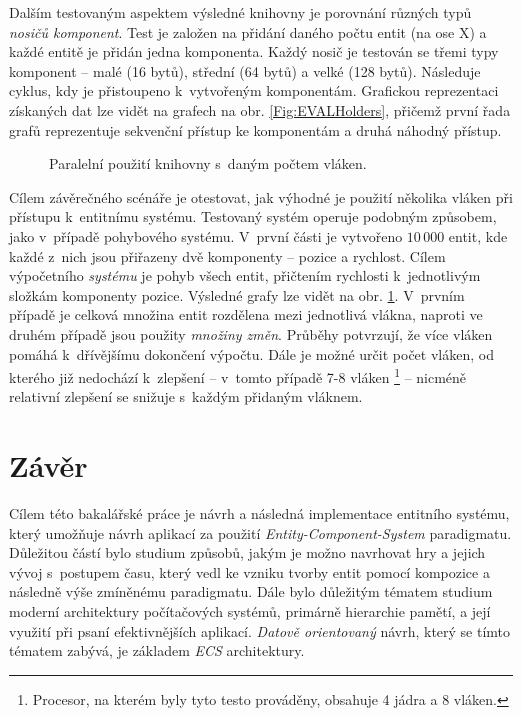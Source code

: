 Dalším testovaným aspektem výsledné knihovny je porovnání různých typů \emph{nosičů komponent}. Test je založen na přidání daného počtu entit (na ose X) a každé entitě je přidán jedna komponenta. Každý nosič je testován se třemi typy komponent -- malé (16 bytů), střední (64 bytů) a velké (128 bytů). Následuje cyklus, kdy je přistoupeno k~vytvořeným komponentám. Grafickou reprezentaci získaných dat lze vidět na grafech na obr. \ref{Fig:EVALHolders}, přičemž první řada grafů reprezentuje sekvenční přístup ke komponentám a druhá náhodný přístup. 

\begin{figure}[H]
	\begin{center}
	\end{center}
	\caption{Paralelní použití knihovny s~daným počtem vláken.}
	\label{Fig:EVALPar}
\end{figure}

Cílem závěrečného scénáře je otestovat, jak výhodné je použití několika vláken při přístupu k~entitnímu systému. Testovaný systém operuje podobným způsobem, jako v~případě pohybového systému. V~první části je vytvořeno $10\,000$ entit, kde každé z~nich jsou přiřazeny dvě komponenty -- pozice a rychlost. Cílem výpočetního \emph{systému} je pohyb všech entit, přičtením rychlosti k~jednotlivým složkám komponenty pozice. Výsledné grafy lze vidět na obr. \ref{Fig:EVALPar}. V~prvním případě je celková množina entit rozdělena mezi jednotlivá vlákna, naproti ve druhém případě jsou použity \emph{množiny změn}. Průběhy potvrzují, že více vláken pomáhá k~dřívějšímu dokončení výpočtu. Dále je možné určit počet vláken, od kterého již nedochází k~zlepšení -- v~tomto případě 7-8 vláken \footnote{Procesor, na kterém byly tyto testo prováděny, obsahuje 4 jádra a 8 vláken.} -- nicméně relativní zlepšení se snižuje s~každým přidaným vláknem.

\chapter{Závěr}

Cílem této bakalářské práce je návrh a následná implementace entitního systému, který umožňuje návrh aplikací za použití \emph{Entity-Component-System} paradigmatu. Důležitou částí bylo studium způsobů, jakým je možno navrhovat hry a jejich vývoj s~postupem času, který vedl ke vzniku tvorby entit pomocí kompozice a následně výše zmíněnému paradigmatu. Dále bylo důležitým tématem studium moderní architektury počítačových systémů, primárně hierarchie pamětí, a její využití při psaní efektivnějších aplikací. \emph{Datově orientovaný} návrh, který se tímto tématem zabývá, je základem \emph{ECS} architektury.

